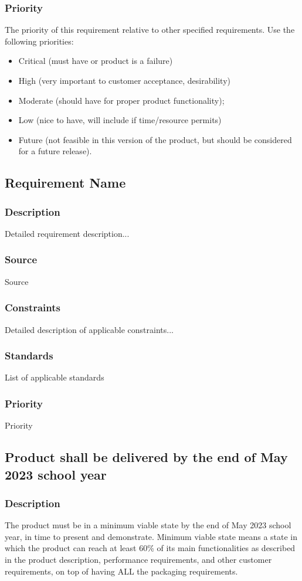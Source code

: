 \subsubsection{Priority}
The priority of this requirement relative to other specified requirements. Use the following priorities:
\begin{itemize}
\item Critical (must have or product is a failure)
\item High (very important to customer acceptance, desirability)
\item Moderate (should have for proper product functionality);
\item Low (nice to have, will include if time/resource permits)
\item Future (not feasible in this version of the product, but should be considered for a future release).
\end{itemize}

\subsection{Requirement Name}
\subsubsection{Description}
Detailed requirement description...
\subsubsection{Source}
Source
\subsubsection{Constraints}
Detailed description of applicable constraints...
\subsubsection{Standards}
List of applicable standards
\subsubsection{Priority}
Priority

\subsection{Product shall be delivered by the end of May 2023 school year}
\subsubsection{Description}
The product must be in a minimum viable state by the end of May 2023 school year, in time to present and demonstrate.  Minimum viable state means a state in which the product can reach at least 60\% of its main functionalities as described in the product description, performance requirements, and other customer requirements, on top of having ALL the packaging requirements.
